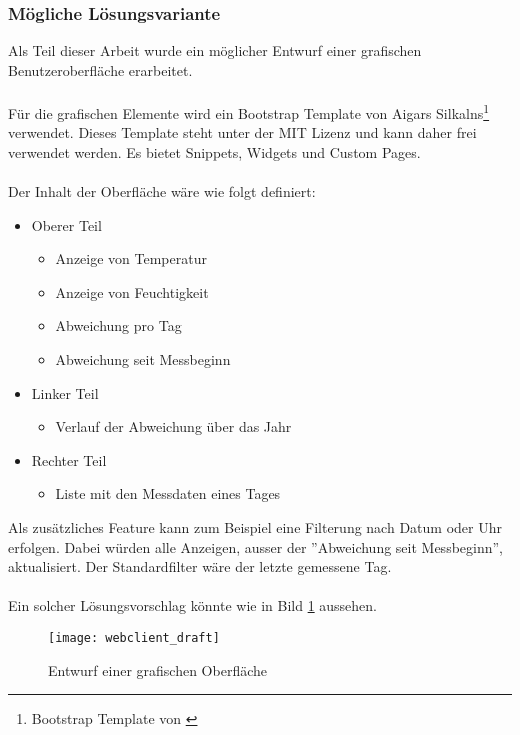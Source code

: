 \subsubsection{Mögliche Lösungsvariante}
Als Teil dieser Arbeit wurde ein möglicher Entwurf einer grafischen Benutzeroberfläche erarbeitet.\\
\\
Für die grafischen Elemente wird ein Bootstrap Template von Aigars Silkalns\footnote{Bootstrap Template von \cite{bootstrap}} verwendet.
Dieses Template steht unter der MIT Lizenz und kann daher frei verwendet werden.
Es bietet Snippets, Widgets und Custom Pages.\\
\\
Der Inhalt der Oberfläche wäre wie folgt definiert:
\begin{itemize}
    \item Oberer Teil \begin{itemize}
        \item Anzeige von Temperatur
        \item Anzeige von Feuchtigkeit
        \item Abweichung pro Tag
        \item Abweichung seit Messbeginn
    \end{itemize}
    \item Linker Teil
    \begin{itemize}
        \item Verlauf der Abweichung über das Jahr
    \end{itemize}
    \item Rechter Teil
    \begin{itemize}
        \item Liste mit den Messdaten eines Tages
    \end{itemize}
\end{itemize}
Als zusätzliches Feature kann zum Beispiel eine Filterung nach Datum oder Uhr erfolgen.
Dabei würden alle Anzeigen, ausser der ''Abweichung seit Messbeginn'', aktualisiert.
Der Standardfilter wäre der letzte gemessene Tag.\\
\\
Ein solcher Lösungsvorschlag könnte wie in Bild \ref{fig:ui_draft} aussehen.

\begin{figure}[H]
    \centering
    \texttt{[image: webclient\_draft]}
    \caption{Entwurf einer grafischen Oberfläche}
    \label{fig:ui_draft}
\end{figure}